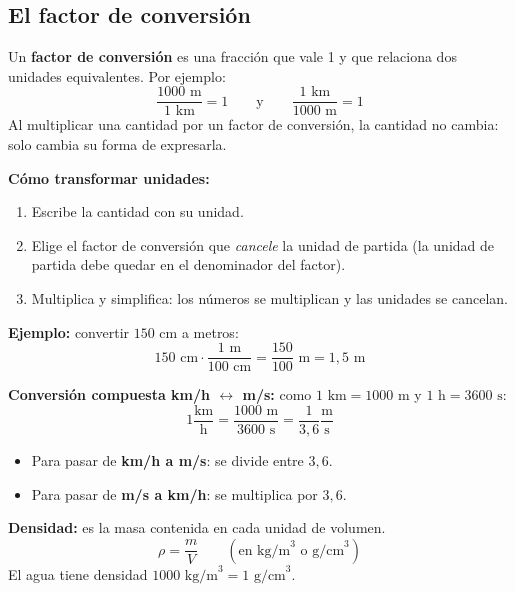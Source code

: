\documentclass[12pt, letterpaper]{article}
\begin{document}
\subsection{El factor de conversión}

\begin{cuadroteoria}
  Un \textbf{factor de conversión} es una fracción que vale 1 y que relaciona dos unidades equivalentes. Por ejemplo:
  $$\frac{1000 \text{ m}}{1 \text{ km}} = 1 \qquad \text{y} \qquad \frac{1 \text{ km}}{1000 \text{ m}} = 1$$
  Al multiplicar una cantidad por un factor de conversión, la cantidad no cambia: solo cambia su forma de expresarla.
\end{cuadroteoria}

\begin{cuadropasos}
  \textbf{Cómo transformar unidades:}
  \begin{enumerate}[leftmargin=*]
    \item Escribe la cantidad con su unidad.
    \item Elige el factor de conversión que \emph{cancele} la unidad de partida (la unidad de partida debe quedar en el denominador del factor).
    \item Multiplica y simplifica: los números se multiplican y las unidades se cancelan.
  \end{enumerate}

  \textbf{Ejemplo:} convertir $150 \text{ cm}$ a metros:
  $$150 \text{ cm} \cdot \frac{1 \text{ m}}{100 \text{ cm}} = \frac{150}{100} \text{ m} = 1{,}5 \text{ m}$$
\end{cuadropasos}

\begin{cuadroteoria}
  \textbf{Conversión compuesta km/h $\leftrightarrow$ m/s:} como $1 \text{ km} = 1000 \text{ m}$ y $1 \text{ h} = 3600 \text{ s}$:
  $$1 \frac{\text{km}}{\text{h}} = \frac{1000 \text{ m}}{3600 \text{ s}} = \frac{1}{3{,}6} \frac{\text{m}}{\text{s}}$$
  \begin{itemize}[leftmargin=*]
    \item Para pasar de \textbf{km/h a m/s}: se divide entre $3{,}6$.
    \item Para pasar de \textbf{m/s a km/h}: se multiplica por $3{,}6$.
  \end{itemize}
\end{cuadroteoria}

\begin{cuadroteoria}
  \textbf{Densidad:} es la masa contenida en cada unidad de volumen.
  $$\rho = \frac{m}{V} \qquad (\text{en } \text{kg/m}^3 \text{ o } \text{g/cm}^3)$$
  El agua tiene densidad $1000 \text{ kg/m}^3 = 1 \text{ g/cm}^3$.
\end{cuadroteoria}
\end{document}
